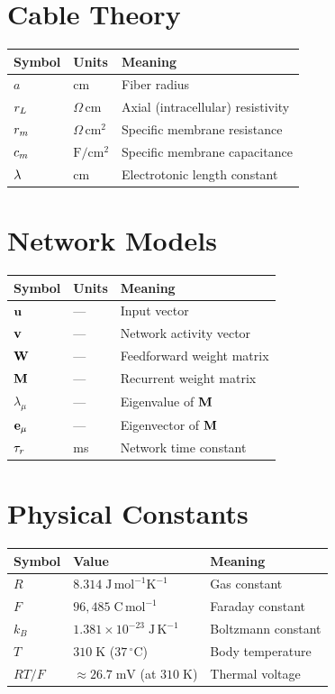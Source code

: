 \section*{Cable Theory}

\begin{tabular}{@{}lll@{}}
  \toprule
  \textbf{Symbol} & \textbf{Units} & \textbf{Meaning} \\
  \midrule
  $a$ & cm & Fiber radius \\
  $r_L$ & $\Omega\,\text{cm}$ & Axial (intracellular) resistivity \\
  $r_m$ & $\Omega\,\text{cm}^2$ & Specific membrane resistance \\
  $c_m$ & $\text{F}/\text{cm}^2$ & Specific membrane capacitance \\
  $\lambda$ & cm & Electrotonic length constant \\
  \bottomrule
\end{tabular}

\section*{Network Models}

\begin{tabular}{@{}lll@{}}
  \toprule
  \textbf{Symbol} & \textbf{Units} & \textbf{Meaning} \\
  \midrule
  $\mathbf{u}$ & --- & Input vector \\
  $\mathbf{v}$ & --- & Network activity vector \\
  $\mathbf{W}$ & --- & Feedforward weight matrix \\
  $\mathbf{M}$ & --- & Recurrent weight matrix \\
  $\lambda_\mu$ & --- & Eigenvalue of $\mathbf{M}$ \\
  $\mathbf{e}_\mu$ & --- & Eigenvector of $\mathbf{M}$ \\
  $\tau_r$ & ms & Network time constant \\
  \bottomrule
\end{tabular}

\section*{Physical Constants}

\begin{tabular}{@{}lll@{}}
  \toprule
  \textbf{Symbol} & \textbf{Value} & \textbf{Meaning} \\
  \midrule
  $R$ & $8.314\;\text{J}\,\text{mol}^{-1}\text{K}^{-1}$ & Gas constant \\
  $F$ & $96{,}485\;\text{C}\,\text{mol}^{-1}$ & Faraday constant \\
  $k_B$ & $1.381 \times 10^{-23}\;\text{J}\,\text{K}^{-1}$ & Boltzmann constant \\
  $T$ & $310\;\text{K}$ ($37\,^\circ\text{C}$) & Body temperature \\
  $RT/F$ & $\approx 26.7\;\text{mV}$ (at $310\;\text{K}$) & Thermal voltage \\
  \bottomrule
\end{tabular}
